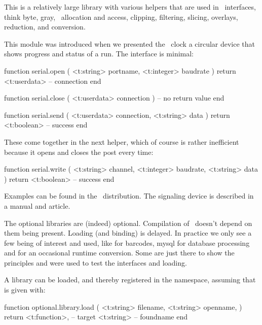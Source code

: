 \stopsection

\startsubsection[title=Bytemaps]

This is a relatively large library with various helpers that are used in
\LUAMETAFUN\ interfaces, think byte, gray, \RGB\ allocation and access, clipping,
filtering, slicing, overlays, reduction, and conversion.

\stopsection

\startsubsection[title=Serial]

This module was introduced when we presented the \CONTEXT\ clock a circular
device that shows progress and status of a run. The interface is minimal:

\starttyping[option=LUA]
function serial.open ( <t:string> portname, <t:integer> baudrate )
    return <t:userdata> -- connection
end

function serial.close ( <t:userdata> connection )
    -- no return value
end

function serial.send ( <t:userdata> connection, <t:string> data )
    return <t:boolean> -- success
end
\stoptyping

These come together in the next helper, which of course is rather inefficient
because it opens and closes the post every time:

\starttyping[option=LUA]
function serial.write (
    <t:string>  channel,
    <t:integer> baudrate,
    <t:string> data
)
    return <t:boolean> -- success
end
\stoptyping

Examples can be found in the \CONTEXT\ distribution. The signaling device is
described in a manual and article.

\stopsection

\startsection[title={Optional}]

\startsubsection[title=Loading]

The optional libraries are (indeed) optional. Compilation of \LUAMETATEX\ doesn't
depend on them being present. Loading (and binding) is delayed. In practice we
only see a few being of interest and used, like  for barcodes, \type
{mysql} for database processing and  for an occasional
runtime conversion. Some are just there to show the principles and were used to
test the interfaces and loading.

A library can be loaded, and thereby registered in the 
namespace, assuming that  is given with:

\starttyping[option=LUA]
function optional.library.load (
    <t:string> filename,
    <t:string> openname,
)
    return
        <t:function>, -- target
        <t:string>    -- foundname
end
\stoptyping

